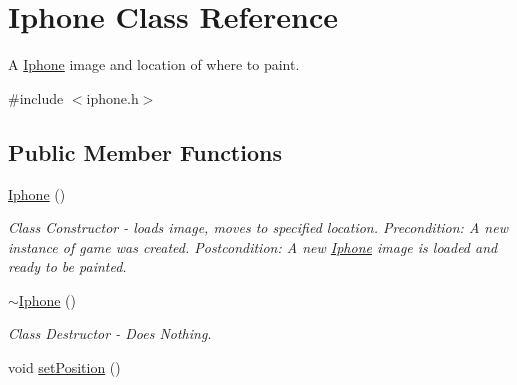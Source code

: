 \hypertarget{classIphone}{\section{\-Iphone \-Class \-Reference}
\label{classIphone}
}


\-A \hyperlink{classIphone}{\-Iphone} image and location of where to paint.  




{\ttfamily \#include $<$iphone.\-h$>$}

\subsection*{\-Public \-Member \-Functions}
\begin{DoxyCompactItemize}
\item 
\hypertarget{classIphone_a01c7c8bf061df2d5602da2f32493f5a6}{\hyperlink{classIphone_a01c7c8bf061df2d5602da2f32493f5a6}{\-Iphone} ()}\label{classIphone_a01c7c8bf061df2d5602da2f32493f5a6}

\begin{DoxyCompactList}\small\item\em \-Class \-Constructor -\/ loads image, moves to specified location. \-Precondition\-: \-A new instance of game was created. \-Postcondition\-: \-A new \hyperlink{classIphone}{\-Iphone} image is loaded and ready to be painted. \end{DoxyCompactList}\item 
\hypertarget{classIphone_acc7406d113bcf8b1c9564ea6e758b1ae}{\hyperlink{classIphone_acc7406d113bcf8b1c9564ea6e758b1ae}{$\sim$\-Iphone} ()}\label{classIphone_acc7406d113bcf8b1c9564ea6e758b1ae}

\begin{DoxyCompactList}\small\item\em \-Class \-Destructor -\/ \-Does \-Nothing. \end{DoxyCompactList}\item 
\hypertarget{classIphone_aaa9838a221acc034e12e8b98ce986970}{void \hyperlink{classIphone_aaa9838a221acc034e12e8b98ce986970}{set\-Position} ()}\label{classIphone_aaa9838a221acc034e12e8b98ce986970}


\end{DoxyCompactItemize}
